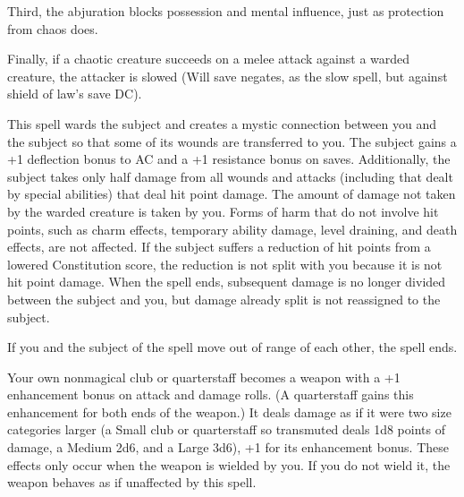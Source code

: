 \begin{multicols}{2}
\begin{small}
\smallskip\noindent Third, the abjuration blocks possession and mental influence, just as protection from chaos does.

\smallskip\noindent Finally, if a chaotic creature succeeds on a melee attack against a warded creature, the attacker is slowed (Will save negates, as the slow spell, but against shield of law's save DC).


\noindent This spell wards the subject and creates a mystic connection between you and the subject so that some of its wounds are transferred to you. The subject gains a +1 deflection bonus to AC and a +1 resistance bonus on saves. Additionally, the subject takes only half damage from all wounds and attacks (including that dealt by special abilities) that deal hit point damage. The amount of damage not taken by the warded creature is taken by you. Forms of harm that do not involve hit points, such as charm effects, temporary ability damage, level draining, and death effects, are not affected. If the subject suffers a reduction of hit points from a lowered Constitution score, the reduction is not split with you because it is not hit point damage. When the spell ends, subsequent damage is no longer divided between the subject and you, but damage already split is not reassigned to the subject.

\smallskip\noindent If you and the subject of the spell move out of range of each other, the spell ends.


\noindent Your own nonmagical club or quarterstaff becomes a weapon with a +1 enhancement bonus on attack and damage rolls. (A quarterstaff gains this enhancement for both ends of the weapon.) It deals damage as if it were two size categories larger (a Small club or quarterstaff so transmuted deals 1d8 points of damage, a Medium 2d6, and a Large 3d6), +1 for its enhancement bonus. These effects only occur when the weapon is wielded by you. If you do not wield it, the weapon behaves as if unaffected by this spell.


\end{small}
\end{multicols}
